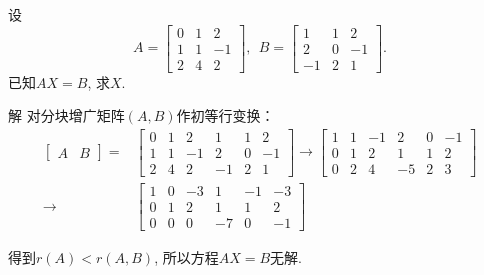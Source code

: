 \begin{eg}
设\begin{displaymath}
A=\begin{bmatrix}0&1&2\\1&1&-1\\2&4&2\end{bmatrix},\ \ B=\begin{bmatrix}1&1&2\\2&0&-1\\-1&2&1\end{bmatrix}.\end{displaymath}
已知$AX=B$, 求$X$.

解 对分块增广矩阵$(A,B)$作初等行变换：
\begin{displaymath}\begin{aligned}
\begin{bmatrix}A&B\end{bmatrix}=&\begin{bmatrix}0&1&2&1&1&2\\1&1&-1&2&0&-1\\2&4&2&-1&2&1\end{bmatrix}\rightarrow
\begin{bmatrix}1&1&-1&2&0&-1\\0&1&2&1&1&2\\0&2&4&-5&2&3\end{bmatrix}\\ \rightarrow &\begin{bmatrix}1&0&-3&1&-1&-3\\0&1&2&1&1&2\\0&0&0&-7&0&-1\end{bmatrix}
\end{aligned}\end{displaymath}

得到$r(A)<r(A,B)$, 所以方程$AX=B$无解.
\end{eg}

